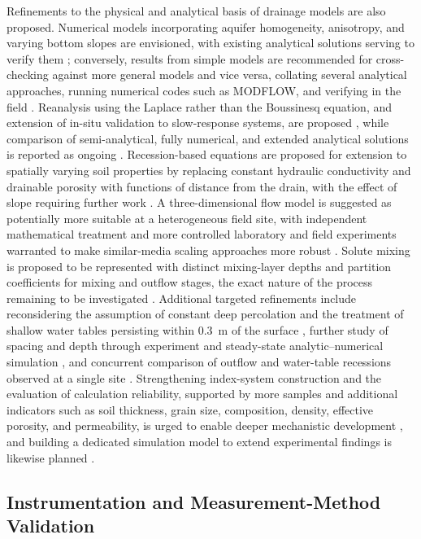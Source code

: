 Refinements to the physical and analytical basis of drainage models are also proposed. Numerical models incorporating aquifer homogeneity, anisotropy, and varying bottom slopes are envisioned, with existing analytical solutions serving to verify them \parencite{Lin2025}; conversely, results from simple models are recommended for cross-checking against more general models and vice versa, collating several analytical approaches, running numerical codes such as MODFLOW, and verifying in the field \parencite{Kacimov2000}. Reanalysis using the Laplace rather than the Boussinesq equation, and extension of in-situ validation to slow-response systems, are proposed \parencite{Bouarfa2000}, while comparison of semi-analytical, fully numerical, and extended analytical solutions is reported as ongoing \parencite{Wiskow2003}. Recession-based equations are proposed for extension to spatially varying soil properties by replacing constant hydraulic conductivity and drainable porosity with functions of distance from the drain, with the effect of slope requiring further work \parencite{Cooke2001}. A three-dimensional flow model is suggested as potentially more suitable at a heterogeneous field site, with independent mathematical treatment and more controlled laboratory and field experiments warranted to make similar-media scaling approaches more robust \parencite{Mohanty1997}. Solute mixing is proposed to be represented with distinct mixing-layer depths and partition coefficients for mixing and outflow stages, the exact nature of the process remaining to be investigated \parencite{Shalit1996}. Additional targeted refinements include reconsidering the assumption of constant deep percolation and the treatment of shallow water tables persisting within 0.3~m of the surface \parencite{Kolars2019}, further study of spacing and depth through experiment and steady-state analytic--numerical simulation \parencite{Saptomo2021}, and concurrent comparison of outflow and water-table recessions observed at a single site \parencite{VANDELEUR1959}. Strengthening index-system construction and the evaluation of calculation reliability, supported by more samples and additional indicators such as soil thickness, grain size, composition, density, effective porosity, and permeability, is urged to enable deeper mechanistic development \parencite{Hou2018}, and building a dedicated simulation model to extend experimental findings is likewise planned \parencite{Tao2019b}.

\subsection{Instrumentation and Measurement-Method Validation}

